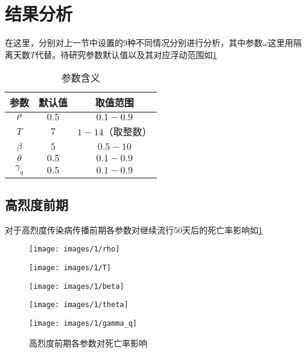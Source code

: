 \documentclass[withoutpreface,bwprint]{cumcmthesis}
\begin{document}
\section{结果分析}
在这里，分别对上一节中设置的9种不同情况分别进行分析，其中参数$\omega$这里用隔离天数$T$代替。待研究参数默认值以及其对应浮动范围如\cref{tb:2}
\begin{table}[H]
    \caption{参数含义}\label{tb:2}
    \centering
    \begin{tabular}{ccc}
        \toprule[1.5pt]
        参数         & 默认值   & 取值范围        \\
        \midrule[1pt]
        $\rho$     & $0.5$ & $0.1-0.9$   \\
        $T$        & $7$   & $1-14$（取整数） \\
        $\beta$    & $5$   & $0.5-10$    \\
        $\theta$   & $0.5$ & $0.1-0.9$   \\
        $\gamma_q$ & $0.5$ & $0.1-0.9$   \\
        \bottomrule[1.5pt]
    \end{tabular}
\end{table}

\subsection{高烈度前期}

对于高烈度传染病传播前期各参数对继续流行50天后的死亡率影响如\cref{fig:6}
\begin{figure}[H]
    \centering
    \begin{minipage}[c]{0.3\textwidth}
        \centering
        \texttt{[image: images/1/rho]}
        \subcaption{$\rho$}
    \end{minipage}
    \begin{minipage}[c]{0.3\textwidth}
        \centering
        \texttt{[image: images/1/T]}
    \end{minipage}
    \begin{minipage}[c]{0.3\textwidth}
        \centering
        \texttt{[image: images/1/beta]}
        \subcaption{$\beta$}
    \end{minipage}

    \begin{minipage}[c]{0.3\textwidth}
        \centering
        \texttt{[image: images/1/theta]}
        \subcaption{$\theta$}
    \end{minipage}
    \begin{minipage}[c]{0.3\textwidth}
        \centering
        \texttt{[image: images/1/gamma\_q]}
    \end{minipage}
    \caption{高烈度前期各参数对死亡率影响}
    \label{fig:6}

\end{figure}
\end{document}
